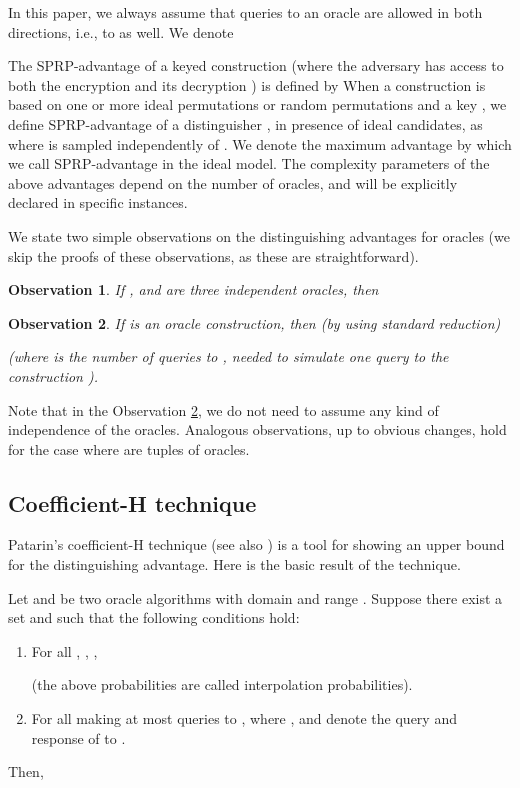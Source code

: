\documentclass{llncs}
\newtheorem{obs}{Observation}
\begin{document}
In this paper, we always assume that queries to an oracle  are allowed in both directions, i.e., to  as well. We denote

The SPRP-advantage of a keyed construction  (where the adversary has access to both the encryption  and its decryption ) is defined by 
When a construction  is based on one or more ideal permutations or random permutations  and a key , we define SPRP-advantage of a distinguisher , in presence of ideal candidates,
as  where  is sampled independently of . We denote the maximum advantage by  which we call SPRP-advantage in the ideal model.
The complexity parameters of the above advantages depend on the number of oracles, and will be explicitly declared in specific instances.

We state two simple observations on the distinguishing advantages for oracles (we skip the proofs of these observations, as these are straightforward).
\begin{obs}\label{obs1}
If ,  and  are three independent oracles, then

\end{obs}
\begin{obs}\label{obs2}
If  is an oracle construction, then (by using standard reduction)

(where  is the number of queries to , needed to simulate one query to the construction ).
\end{obs}

Note that in the Observation \ref{obs2}, we do not need to assume any kind of independence of the oracles. Analogous observations, up to obvious changes, hold for the case where  are tuples of oracles.

\subsection{Coefficient-H technique}
Patarin's coefficient-H technique \cite{Patarin1} (see also \cite{Patarin3}) is a tool for showing an upper bound for the distinguishing advantage. Here is the basic result of the technique.

\begin{theorem}
\label{fact:H}
Let  and  be two oracle algorithms with domain  and range . Suppose there exist a set  and  such that the following conditions hold:
\begin{enumerate}
\item
For all , , ,

(the above probabilities are called interpolation probabilities).
\item
For all  making at most  queries to ,  where ,  and  denote the   query and response of  to .
\end{enumerate}
Then,

\end{theorem}
\end{document}

